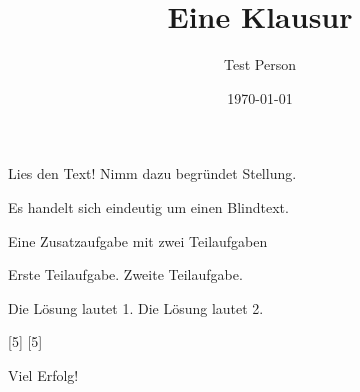 \documentclass[a4paper]{scrartcl}
\author{Test Person}
\date{\today}
\title{Eine Klausur}
\begin{document}
\begin{aufgabe}
    \blindtext
    \begin{teilaufgaben}
        \teilaufgabe[5] Lies den Text!
        \teilaufgabe[10] Nimm dazu begründet Stellung.
    \end{teilaufgaben}
    \begin{loesung}
        Es handelt sich eindeutig um einen Blindtext.
    \end{loesung}
    \begin{erwartungen}
    \end{erwartungen}
\end{aufgabe}

\begin{aufgabe*}
    Eine Zusatzaufgabe mit zwei Teilaufgaben
    \begin{teilaufgaben}
        \teilaufgabe Erste Teilaufgabe.
        \teilaufgabe Zweite Teilaufgabe.
    \end{teilaufgaben}
    \begin{loesung*}
        \begin{teilaufgaben}
            \teilaufgabe Die Lösung lautet 1.
            \teilaufgabe Die Lösung lautet 2.
        \end{teilaufgaben}
    \end{loesung*}
    \begin{erwartungen}
        [5]
        [5]
    \end{erwartungen}
\end{aufgabe*}

\vspace{1cm}
{\Huge Viel Erfolg!}
\end{document}
